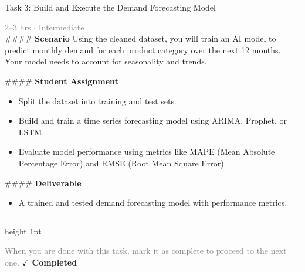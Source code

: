 \documentclass[10pt,a4paper]{article}
\begin{document}
\begin{taskbox}{Task 3: Build and Execute the Demand Forecasting Model}

    {\small \textcolor{gray}{2--3 hrs $\cdot$ Intermediate}}\\[12pt]

    \#\#\#\# \textbf{Scenario}  
Using the cleaned dataset, you will train an AI model to predict monthly demand for each product category over the next 12 months. Your model needs to account for seasonality and trends.

\#\#\#\# \textbf{Student Assignment}  
\begin{itemize}
    \item Split the dataset into training and test sets.  
    \item Build and train a time series forecasting model using ARIMA, Prophet, or LSTM.  
    \item Evaluate model performance using metrics like MAPE (Mean Absolute Percentage Error) and RMSE (Root Mean Square Error).  
\end{itemize}

\#\#\#\# \textbf{Deliverable}  
\begin{itemize}
    \item A trained and tested demand forecasting model with performance metrics.\par
\end{itemize}

    \vspace{16pt}

    \textcolor{cardBorder}{\hrule height 1pt}\vspace{8pt}

    \small \textcolor{gray}{When you are done with this task, mark it as complete to proceed to the next one.} \hfill \textbf{\textcolor{brandDark}{$\checkmark$ Completed}}

\end{taskbox}
\end{document}
